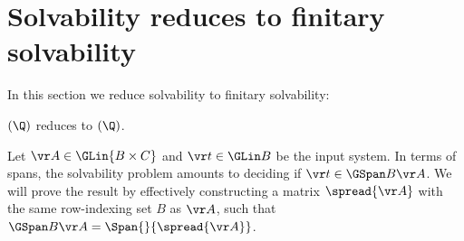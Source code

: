 
\section{Solvability reduces to finitary solvability} \label{sec:solv2fin-solv}
%
In this section we reduce solvability to finitary solvability:
%
\begin{theorem}\label{thm:gen red}
\solvname$(\Q)$ reduces to \finsolvname$(\Q)$.  %
\end{theorem}
%

%
Let $\vr A \in \GLin{B \times C}$ and $\vr t\in\GLin B$ be the input system.
In terms of spans, the solvability problem amounts to deciding if $\vr t \in \GSpan B {\vr A}$.
We will prove the result by effectively constructing a matrix $\spread {\vr A}$ with the same row-indexing set
$B$ as $\vr A$, such that $\GSpan B {\vr A} = \Span {} {\spread {\vr A}}$.

